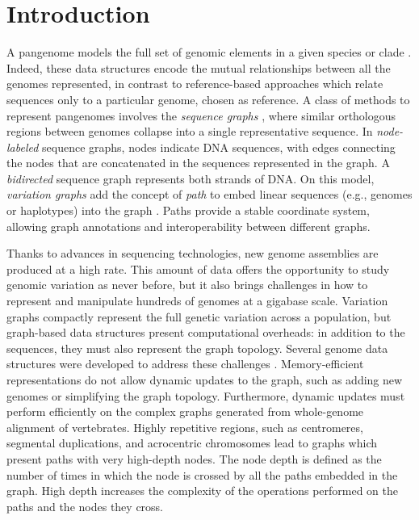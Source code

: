 \documentclass{bioinfo}
\begin{document}
    \section{Introduction}

    A pangenome models the full set of genomic elements in a given species or clade \citep{32453966}. Indeed, these
    data structures encode the mutual relationships between all the genomes represented, in contrast to reference-based
    approaches which relate sequences only to a particular genome, chosen as reference. A class of methods to represent
    pangenomes involves the \textit{sequence graphs} \citep{2488477}, where similar orthologous regions between genomes
    collapse into a single representative sequence. In \textit{node-labeled} sequence graphs, nodes indicate DNA
    sequences, with edges connecting the nodes that are concatenated in the sequences represented in the graph. A
    \textit{bidirected} sequence graph represents both strands of DNA. On this model, \textit{variation graphs} add the
    concept of \textit{path} to embed linear sequences (e.g., genomes or haplotypes) into the graph \citep{30125266}.
    Paths provide a stable coordinate system, allowing graph annotations and interoperability between different graphs.

    Thanks to advances in sequencing technologies, new genome assemblies are produced at a high rate. This amount of
    data offers the opportunity to study genomic variation as never before, but it also brings challenges in how to
    represent and manipulate hundreds of genomes at a gigabase scale. Variation graphs compactly represent the full
    genetic variation across a population, but graph-based data structures present computational overheads: in addition
    to the sequences, they must also represent the graph topology. Several genome data structures were developed to
    address these challenges \citep{33040146}. Memory-efficient representations do not allow dynamic updates to the
    graph, such as adding new genomes or simplifying the graph topology. Furthermore, dynamic updates must perform
    efficiently on the complex graphs generated from whole-genome alignment of vertebrates. Highly repetitive regions,
    such as centromeres, segmental duplications, and acrocentric chromosomes lead to graphs which present paths with
    very high-depth nodes. The node depth is defined as the number of times in which the node is crossed by all the
    paths embedded in the graph. High depth increases the complexity of the operations performed on the paths and the
    nodes they cross.
\end{document}
